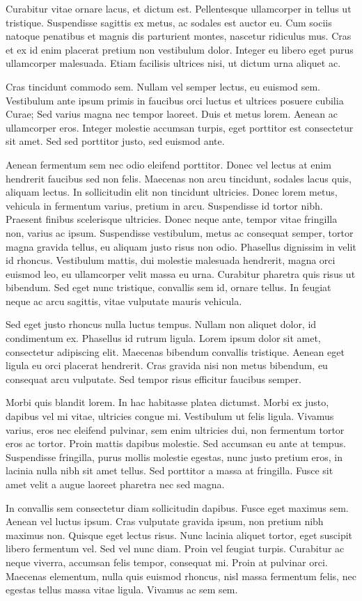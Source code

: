 Curabitur vitae ornare lacus, et dictum est. Pellentesque ullamcorper
in tellus ut tristique. Suspendisse sagittis ex metus, ac sodales
est auctor eu. Cum sociis natoque penatibus et magnis dis parturient
montes, nascetur ridiculus mus. Cras et ex id enim placerat pretium
non vestibulum dolor. Integer eu libero eget purus ullamcorper malesuada.
Etiam facilisis ultrices nisi, ut dictum urna aliquet ac.

Cras tincidunt commodo sem. Nullam vel semper lectus, eu euismod sem.
Vestibulum ante ipsum primis in faucibus orci luctus et ultrices posuere
cubilia Curae; Sed varius magna nec tempor laoreet. Duis et metus
lorem. Aenean ac ullamcorper eros. Integer molestie accumsan turpis,
eget porttitor est consectetur sit amet. Sed sed porttitor justo,
sed euismod ante.

Aenean fermentum sem nec odio eleifend porttitor. Donec vel lectus
at enim hendrerit faucibus sed non felis. Maecenas non arcu tincidunt,
sodales lacus quis, aliquam lectus. In sollicitudin elit non tincidunt
ultricies. Donec lorem metus, vehicula in fermentum varius, pretium
in arcu. Suspendisse id tortor nibh. Praesent finibus scelerisque
ultricies. Donec neque ante, tempor vitae fringilla non, varius ac
ipsum. Suspendisse vestibulum, metus ac consequat semper, tortor magna
gravida tellus, eu aliquam justo risus non odio. Phasellus dignissim
in velit id rhoncus. Vestibulum mattis, dui molestie malesuada hendrerit,
magna orci euismod leo, eu ullamcorper velit massa eu urna. Curabitur
pharetra quis risus ut bibendum. Sed eget nunc tristique, convallis
sem id, ornare tellus. In feugiat neque ac arcu sagittis, vitae vulputate
mauris vehicula.

Sed eget justo rhoncus nulla luctus tempus. Nullam non aliquet dolor,
id condimentum ex. Phasellus id rutrum ligula. Lorem ipsum dolor sit
amet, consectetur adipiscing elit. Maecenas bibendum convallis tristique.
Aenean eget ligula eu orci placerat hendrerit. Cras gravida nisi non
metus bibendum, eu consequat arcu vulputate. Sed tempor risus efficitur
faucibus semper.

Morbi quis blandit lorem. In hac habitasse platea dictumst. Morbi
ex justo, dapibus vel mi vitae, ultricies congue mi. Vestibulum ut
felis ligula. Vivamus varius, eros nec eleifend pulvinar, sem enim
ultricies dui, non fermentum tortor eros ac tortor. Proin mattis dapibus
molestie. Sed accumsan eu ante at tempus. Suspendisse fringilla, purus
mollis molestie egestas, nunc justo pretium eros, in lacinia nulla
nibh sit amet tellus. Sed porttitor a massa at fringilla. Fusce sit
amet velit a augue laoreet pharetra nec sed magna.

In convallis sem consectetur diam sollicitudin dapibus. Fusce eget
maximus sem. Aenean vel luctus ipsum. Cras vulputate gravida ipsum,
non pretium nibh maximus non. Quisque eget lectus risus. Nunc lacinia
aliquet tortor, eget suscipit libero fermentum vel. Sed vel nunc diam.
Proin vel feugiat turpis. Curabitur ac neque viverra, accumsan felis
tempor, consequat mi. Proin at pulvinar orci. Maecenas elementum,
nulla quis euismod rhoncus, nisl massa fermentum felis, nec egestas
tellus massa vitae ligula. Vivamus ac sem sem. 
